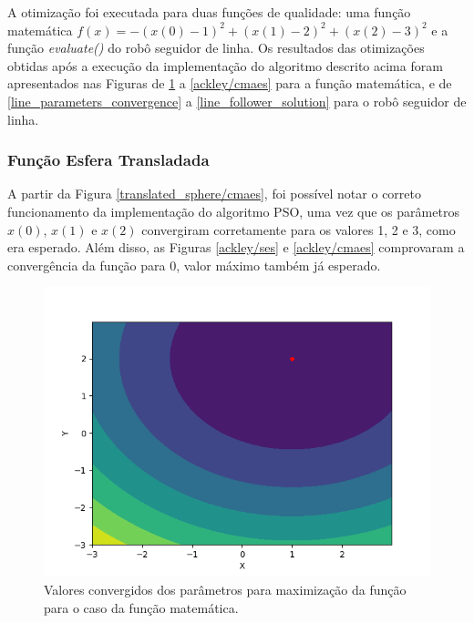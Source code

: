 \documentclass[conference]{IEEEtran}
\begin{document}
A otimização foi executada para duas funções de qualidade: uma função matemática $f\left ( x \right ) = - \left ( x\left ( 0 \right ) - 1 \right )^{2} + \left ( x\left ( 1 \right ) - 2 \right )^{2} + \left ( x\left ( 2 \right ) - 3 \right )^{2}$ e a função \textit{evaluate()} do robô seguidor de linha. Os resultados das otimizações obtidas após a execução da implementação do algoritmo descrito acima foram apresentados nas Figuras de \ref{translated_sphere/ses} a \ref{ackley/cmaes} para a função matemática, e de \ref{line_parameters_convergence} a \ref{line_follower_solution} para o robô seguidor de linha.

\subsubsection{Função Esfera Transladada}

A partir da Figura \ref{translated_sphere/cmaes}, foi possível notar o correto funcionamento da implementação do algoritmo PSO, uma vez que os parâmetros $x(0)$, $x(1)$ e $x(2)$ convergiram corretamente para os valores 1, 2 e 3, como era esperado. Além disso, as Figuras \ref{ackley/ses} e \ref{ackley/cmaes} comprovaram a convergência da função para $0$, valor máximo também já esperado.

\begin{figure}[htbp]
\centering
\centerline{\includegraphics[scale=0.4]{imagens/translated_sphere/ses.png}}
\caption{Valores convergidos dos parâmetros para maximização da função para o caso da função matemática.}
\label{translated_sphere/ses}
\end{figure}
\end{document}

